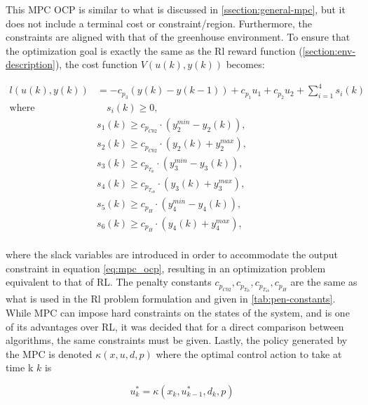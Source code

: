 This MPC OCP is similar to what is discussed in \autoref{ssection:general-mpc}, but it does not include a terminal cost or constraint/region. Furthermore, the constraints are aligned with that of the greenhouse environment.  To ensure that the optimization goal is exactly the same as the Rl reward function (\autoref{section:env-description}), the cost function $V(u(k),y(k))$ becomes:

\begin{equation} \label{eq:mpc_stage_cost}
	\begin{aligned}
		l(u(k),y(k)) & = - c_{p_3} (y(k) - y(k-1)) + c_{p_1} u_{1} + c_{p_2} u_{2} + \sum_{i = 1}^4 s_i(k) \\
		\text{where} & \quad s_i(k) \geq 0, \\
		& s_1(k) \geq c_{p_{C02}} \cdot (y_2^{min} - y_2(k)), \\ 
		& s_2(k) \geq c_{p_{C02}} \cdot (y_2(k) + y_2^{max}), \\ 
		& s_3(k) \geq c_{p_{T_{lb}}} \cdot (y_3^{min} - y_3(k)), \\ 
		& s_4(k) \geq c_{p_{T_{ub}}} \cdot (y_3(k) + y_3^{max}), \\ 
		& s_5(k) \geq c_{p_{H}} \cdot (y_4^{min} - y_4(k)), \\ 
		& s_6(k) \geq c_{p_{H}} \cdot (y_4(k) + y_4^{max}), \\
	\end{aligned}	
\end{equation}

where the slack variables are introduced in order to accommodate the output constraint in equation \autoref{eq:mpc_ocp}, resulting in an optimization problem equivalent to that of RL. The penalty constants $c_{p_{C02}},c_{p_{T_{lb}}},c_{p_{T_{ub}}},c_{p_{H}}$ are the same as what is used in the Rl problem formulation and given in \autoref{tab:pen-constants}. While MPC can impose hard constraints on the states of the system, and is one of its advantages over RL, it was decided that for a direct comparison between algorithms, the same constraints must be given. Lastly, the policy generated by the MPC is denoted $\kappa(x,u,d,p)$ where the optimal control action to take at time k $k$ is

\begin{equation}\label{eq:mpc_policy_notation}
	u_k^* = \kappa(x_k,u_{k-1}^*, d_k, p)
\end{equation}


